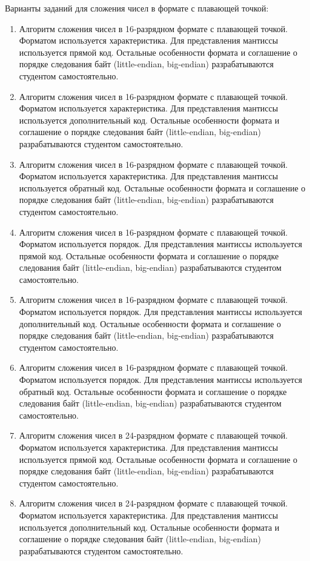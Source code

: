 Варианты заданий для сложения чисел в формате с плавающей точкой:
\begin{enumerate}
    \item Алгоритм сложения чисел в 16-разрядном формате с плавающей точкой. Форматом используется характеристика. Для представления мантиссы используется прямой код. Остальные особенности формата и соглашение о порядке следования байт (little-endian, big-endian) разрабатываются студентом самостоятельно.
    \item Алгоритм сложения чисел в 16-разрядном формате с плавающей точкой. Форматом используется характеристика. Для представления мантиссы используется дополнительный код. Остальные особенности формата и соглашение о порядке следования байт (little-endian, big-endian) разрабатываются студентом самостоятельно.
    \item Алгоритм сложения чисел в 16-разрядном формате с плавающей точкой. Форматом используется характеристика. Для представления мантиссы используется обратный код. Остальные особенности формата и соглашение о порядке следования байт (little-endian, big-endian) разрабатываются студентом самостоятельно.
    \item Алгоритм сложения чисел в 16-разрядном формате с плавающей точкой. Форматом используется порядок. Для представления мантиссы используется прямой код. Остальные особенности формата и соглашение о порядке следования байт (little-endian, big-endian) разрабатываются студентом самостоятельно.
    \item Алгоритм сложения чисел в 16-разрядном формате с плавающей точкой. Форматом используется порядок. Для представления мантиссы используется дополнительный код. Остальные особенности формата и соглашение о порядке следования байт (little-endian, big-endian) разрабатываются студентом самостоятельно.
    \item Алгоритм сложения чисел в 16-разрядном формате с плавающей точкой. Форматом используется порядок. Для представления мантиссы используется обратный код. Остальные особенности формата и соглашение о порядке следования байт (little-endian, big-endian) разрабатываются студентом самостоятельно.
    \item Алгоритм сложения чисел в 24-разрядном формате с плавающей точкой. Форматом используется характеристика. Для представления мантиссы используется прямой код. Остальные особенности формата и соглашение о порядке следования байт (little-endian, big-endian) разрабатываются студентом самостоятельно.
    \item Алгоритм сложения чисел в 24-разрядном формате с плавающей точкой. Форматом используется характеристика. Для представления мантиссы используется дополнительный код. Остальные особенности формата и соглашение о порядке следования байт (little-endian, big-endian) разрабатываются студентом самостоятельно.

\end{enumerate}
